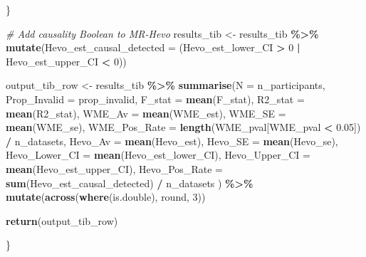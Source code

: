 \documentclass[
]{article}
\newenvironment{Shaded}{\begin{snugshade}}{\end{snugshade}}
\newcommand{\AttributeTok}[1]{\textcolor[rgb]{0.13,0.29,0.53}{#1}}
\newcommand{\CommentTok}[1]{\textcolor[rgb]{0.56,0.35,0.01}{\textit{#1}}}
\newcommand{\DecValTok}[1]{\textcolor[rgb]{0.00,0.00,0.81}{#1}}
\newcommand{\FloatTok}[1]{\textcolor[rgb]{0.00,0.00,0.81}{#1}}
\newcommand{\FunctionTok}[1]{\textcolor[rgb]{0.13,0.29,0.53}{\textbf{#1}}}
\newcommand{\NormalTok}[1]{#1}
\newcommand{\OtherTok}[1]{\textcolor[rgb]{0.56,0.35,0.01}{#1}}
\newcommand{\SpecialCharTok}[1]{\textcolor[rgb]{0.81,0.36,0.00}{\textbf{#1}}}
\begin{document}
\begin{Shaded}
\begin{Highlighting}[]
\NormalTok{  \}}
  
  \CommentTok{\# Add causality Boolean to MR{-}Hevo}
\NormalTok{  results\_tib }\OtherTok{\textless{}{-}}\NormalTok{ results\_tib }\SpecialCharTok{\%\textgreater{}\%}
   \FunctionTok{mutate}\NormalTok{(}\AttributeTok{Hevo\_est\_causal\_detected =}\NormalTok{ (Hevo\_est\_lower\_CI }\SpecialCharTok{\textgreater{}} \DecValTok{0}  \SpecialCharTok{|}\NormalTok{ Hevo\_est\_upper\_CI }\SpecialCharTok{\textless{}} \DecValTok{0}\NormalTok{))}
  
  
\NormalTok{  output\_tib\_row }\OtherTok{\textless{}{-}}\NormalTok{ results\_tib }\SpecialCharTok{\%\textgreater{}\%} 
    \FunctionTok{summarise}\NormalTok{(}\AttributeTok{N =}\NormalTok{ n\_participants,}
              \AttributeTok{Prop\_Invalid =}\NormalTok{ prop\_invalid,}
              \AttributeTok{F\_stat =} \FunctionTok{mean}\NormalTok{(F\_stat),}
              \AttributeTok{R2\_stat =} \FunctionTok{mean}\NormalTok{(R2\_stat),}
              \AttributeTok{WME\_Av =} \FunctionTok{mean}\NormalTok{(WME\_est),}
              \AttributeTok{WME\_SE =} \FunctionTok{mean}\NormalTok{(WME\_se),}
              \AttributeTok{WME\_Pos\_Rate =} \FunctionTok{length}\NormalTok{(WME\_pval[WME\_pval }\SpecialCharTok{\textless{}} \FloatTok{0.05}\NormalTok{]) }\SpecialCharTok{/}\NormalTok{ n\_datasets,}
              \AttributeTok{Hevo\_Av =} \FunctionTok{mean}\NormalTok{(Hevo\_est),}
              \AttributeTok{Hevo\_SE =} \FunctionTok{mean}\NormalTok{(Hevo\_se),}
              \AttributeTok{Hevo\_Lower\_CI =} \FunctionTok{mean}\NormalTok{(Hevo\_est\_lower\_CI),}
              \AttributeTok{Hevo\_Upper\_CI =} \FunctionTok{mean}\NormalTok{(Hevo\_est\_upper\_CI),}
              \AttributeTok{Hevo\_Pos\_Rate =} \FunctionTok{sum}\NormalTok{(Hevo\_est\_causal\_detected) }\SpecialCharTok{/}\NormalTok{ n\_datasets}
\NormalTok{    ) }\SpecialCharTok{\%\textgreater{}\%} 
    \FunctionTok{mutate}\NormalTok{(}\FunctionTok{across}\NormalTok{(}\FunctionTok{where}\NormalTok{(is.double), round, }\DecValTok{3}\NormalTok{))}
  
  \FunctionTok{return}\NormalTok{(output\_tib\_row)}
  
\NormalTok{\}}
\end{Highlighting}
\end{Shaded}
\end{document}
